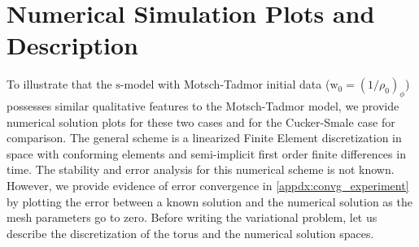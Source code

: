 \documentclass[11pt,letterpaper]{amsart}
\theoremstyle{plain}
\theoremstyle{definition}
\theoremstyle{remark}
\def \st {\mathrm{s}}
\def \wt {\mathrm{w}}
\begin{document}
\section{Numerical Simulation Plots and Description}
    \label{description_of_numerics} 
    To illustrate that the $\st$-model with Motsch-Tadmor 
    initial data ($\wt_0 = (1/\rho_0)_{\phi}$) possesses similar qualitative features 
    to the Motsch-Tadmor model, we provide numerical solution plots for these two cases 
    and for the Cucker-Smale case for comparison.  
    The general scheme is a linearized Finite Element discretization 
    in space with conforming elements and semi-implicit first order finite differences in time. 
    The stability and error analysis for this numerical scheme is not known.  
    However, we provide evidence of error convergence in \ref{appdx:convg_experiment}
    by plotting the error between a known solution and the numerical solution as the mesh parameters go to zero. 
    Before writing the variational problem, let us describe the discretization of the torus and the numerical solution spaces. 
    
\end{document}
